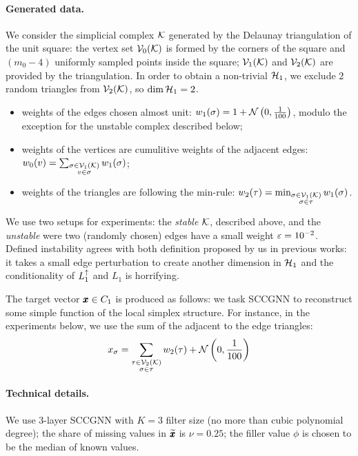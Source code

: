 \documentclass{mynotes}
\begin{document}
\paragraph{Generated data. } We consider the simplicial complex \( \mathcal{K} \) generated by the Delaunay triangulation of the unit square: the vertex set \( \mathcal{V}_{0}(\mathcal{K}) \) is formed by the corners of the square and \( \left( m_0 - 4 \right) \) uniformly sampled points inside the square; \( \mathcal{V}_{1}(\mathcal{K}) \) and \( \mathcal{V}_{2}(\mathcal{K}) \) are provided by the triangulation. In order to obtain a non-trivial \( \mathcal{H}_1 \), we exclude \( 2 \) random triangles from \( \mathcal{V}_{2}(\mathcal{K}) \), so \( \dim \mathcal{H}_1 = 2 \).
\begin{itemize}[itemsep=-5pt]
      \item weights of the edges chosen almost unit: \( w_1( \sigma ) = 1 + \mathcal{N} \left( 0, \frac{1}{100} \right) \), modulo the exception for the unstable complex described below;
      \item weights of the vertices are cumulitive weights of the adjacent edges: \( w_0 ( v ) = \sum_{\substack{ \sigma \in \mathcal{V}_{1}(\mathcal{K}) \\ v \in \sigma }} w_1(\sigma) \);
      \item weights of the triangles are following the min-rule:
      \( w_2( \tau ) = \min_{\substack{ \sigma \in \mathcal{V}_{1}(\mathcal{K}) \\ \sigma \in \tau }} w_1(\sigma)\).
\end{itemize}

We use two setups for experiments: the \emph{stable} \( \mathcal{K} \), described above, and the \emph{unstable} were two (randomly chosen) edges have a small weight \( \varepsilon = 10^{-2} \). Defined instability agrees with both definition proposed by us in previous works: it takes a small edge perturbation to create another dimension in \( \mathcal{H}_1 \) and the conditionality of \( L_{1}^{\uparrow} \) and \( L_1 \) is horrifying.

The target vector \( \pmb{x} \in C_1 \) is produced as follows: we task SCCGNN to reconstruct some simple function of the local simplex structure. For instance, in the experiments below, we use the sum of the adjacent to the edge triangles:
\begin{equation}
      x_\sigma = \sum_{\substack{ \tau \in \mathcal{V}_{2}(\mathcal{K}) \\ \sigma \in \tau }} w_2(\tau) + \mathcal{N} \left( 0, \frac{1}{100} \right) 
\end{equation} 



\paragraph{ Technical details. } We use \( 3 \)-layer SCCGNN with \( K = 3 \) filter size (no more than cubic polynomial degree); the share of missing values in \( \widetilde{\pmb{x}} \) is \( \nu = 0.25 \); the filler value \( \phi \) is chosen to be the median of known values.
\end{document}
